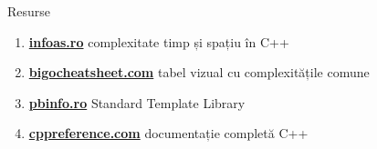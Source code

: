 \documentclass[10pt]{beamer}
\begin{document}
\begin{frame}{Resurse}
  \begin{enumerate}
    \item \href{https://infoas.ro/lectie/91/complexitatea-unui-algoritm-timp-si-spatiu-in-c}{\textbf{infoas.ro}}
          \textemdash{} complexitate timp și spațiu în C++
    \item \href{https://www.bigocheatsheet.com/}{\textbf{bigocheatsheet.com}}
          \textemdash{} tabel vizual cu complexitățile comune
    \item \href{https://www.pbinfo.ro/articole/23702/standard-template-library-stl}{\textbf{pbinfo.ro}}
          \textemdash{} Standard Template Library
    \item \href{https://cppreference.com}{\textbf{cppreference.com}}
          \textemdash{} documentație completă C++
  \end{enumerate}
\end{frame}
\end{document}

